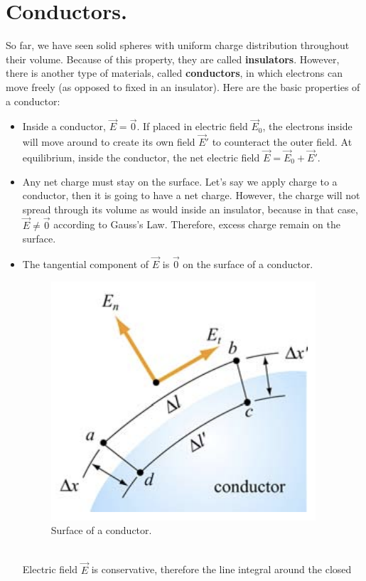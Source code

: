 \documentclass[11pt, letterpaper]{article}
\begin{document}
	
	\pagebreak
	
	\section{Conductors.}
	So far, we have seen solid spheres with uniform charge distribution throughout their volume.
	Because of this property, they are called \textbf{insulators}. However, there is another type of
	materials, called \textbf{conductors}, in which electrons can move freely (as opposed to fixed
	in an insulator). Here are the basic properties of a conductor:
	\begin{itemize}
		\item Inside a conductor, $\vec{E} = \vec{0}$. If placed in electric field $\vec{E}_0$, the
		electrons inside will move around to create its own field $\vec{E}'$ to counteract the outer
		field. At equilibrium, inside the conductor, the net electric field $\vec{E} = \vec{E}_0 + 
		\vec{E}'$.
		\item Any net charge must stay on the surface. Let's say we apply charge to a conductor, 
		then it is going to have a net charge. However, the charge will not spread through its
		volume as would inside an insulator, because in that case, $\vec{E} \neq \vec{0}$ according
		to Gauss's Law. Therefore, excess charge remain on the surface.
		\item The tangential component of $\vec{E}$ is $\vec{0}$ on the surface of a conductor.
		\begin{figure}[h!]
			\centering
			\includegraphics[scale=0.6]{tangent}
			\caption{Surface of a conductor.}
		\end{figure}\\
		Electric field $\vec{E}$ is conservative, therefore the line integral around the closed 

\end{itemize}
\end{document}
